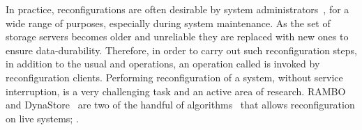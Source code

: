 %
In practice, reconfigurations are often desirable by system administrators~\cite{aguileratutorial}, for a wide range of 
purposes,  
	especially during system maintenance. As the set of storage servers becomes older and unreliable they are replaced with new ones to ensure data-durability. 
	 Therefore, in order to carry out such reconfiguration steps, in addition to the usual   and  operations, an operation called   is  invoked  by  reconfiguration clients.
 Performing reconfiguration of a system, without service
interruption, is a very challenging task and an active area of research. RAMBO~\cite{LS02} and DynaStore~\cite{ AKMS09}  are two of the handful 
of algorithms~\cite{CGGMS09, GM15, G03, LVM15, SMMK2010, spiegelman:DISC:2017} that allows reconfiguration on live systems; . 

